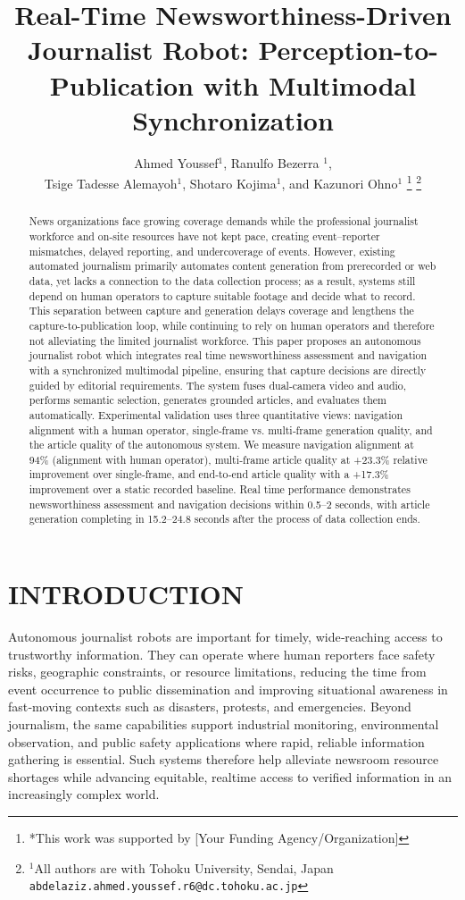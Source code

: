 \documentclass[letterpaper, 10 pt, conference]{ieeeconf}  %
\title{\LARGE \bf
Real-Time Newsworthiness-Driven Journalist Robot: Perception-to-Publication with Multimodal Synchronization
}
\author{}
\author{Ahmed Youssef$^{1}$, Ranulfo Bezerra $^{1}$, \\
Tsige Tadesse Alemayoh$^{1}$, Shotaro Kojima$^{1}$, and Kazunori Ohno$^{1}$%
\thanks{*This work was supported by [Your Funding Agency/Organization]}%
\thanks{$^{1}$All authors are with Tohoku University, Sendai, Japan
        {\tt\small abdelaziz.ahmed.youssef.r6@dc.tohoku.ac.jp}}%
}
\begin{document}
\maketitle
\thispagestyle{empty}
\pagestyle{empty}


\begin{abstract}
News organizations face growing coverage demands while the professional journalist workforce and on-site resources have not kept pace, creating event–reporter mismatches, delayed reporting, and undercoverage of events. However, existing automated journalism primarily automates content generation from prerecorded or web data, yet lacks a connection to the data collection process; as a result, systems still depend on human operators to capture suitable footage and decide what to record. This separation between capture and generation delays coverage and lengthens the capture-to-publication loop, while continuing to rely on human operators and therefore not alleviating the limited journalist workforce. This paper proposes an autonomous journalist robot which integrates real time newsworthiness assessment and navigation with a synchronized multimodal pipeline, ensuring that capture decisions are directly guided by editorial requirements. The system fuses dual-camera video and audio, performs semantic selection, generates grounded articles, and evaluates them automatically. Experimental validation uses three quantitative views: navigation alignment with a human operator, single‑frame vs. multi‑frame generation quality, and the article quality of the autonomous system. We measure navigation alignment at 94\% (alignment with human operator), multi‑frame article quality at +23.3\% relative improvement over single‑frame, and end‑to‑end article quality with a +17.3\% improvement over a static recorded baseline. Real time performance demonstrates newsworthiness assessment and navigation decisions within 0.5–2 seconds, with article generation completing in 15.2–24.8 seconds after the process of data collection ends.
\end{abstract}


\section{INTRODUCTION}

Autonomous journalist robots are important for timely, wide‑reaching access to trustworthy information. They can operate where human reporters face safety risks, geographic constraints, or resource limitations, reducing the time from event occurrence to public dissemination and improving situational awareness in fast‑moving contexts such as disasters, protests, and emergencies. Beyond journalism, the same capabilities support industrial monitoring, environmental observation, and public safety applications where rapid, reliable information gathering is essential. Such systems therefore help alleviate newsroom resource shortages \cite{pew2021newsroom} while advancing equitable, real\-time access to verified information in an increasingly complex world.
\end{document}
